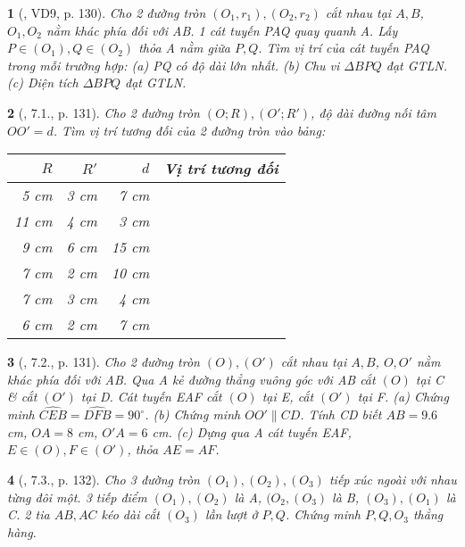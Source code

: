 \documentclass{article}
\newtheorem{baitoan}{}
\begin{document}
\begin{baitoan}[\cite{Binh_boi_duong_Toan_9_tap_1}, VD9, p. 130]
	Cho 2 đường tròn $(O_1,r_1),(O_2,r_2)$ cắt nhau tại $A,B$, $O_1,O_2$ nằm khác phía đối với AB. 1 cát tuyến PAQ quay quanh A. Lấy $P\in(O_1),Q\in(O_2)$ thỏa A nằm giữa $P,Q$. Tìm vị trí của cát tuyến PAQ trong mỗi trường hợp: (a) PQ có độ dài lớn nhất. (b) Chu vi $\Delta BPQ$ đạt {\rm GTLN}. (c) Diện tích $\Delta BPQ$ đạt {\rm GTLN}.
\end{baitoan}

\begin{baitoan}[\cite{Binh_boi_duong_Toan_9_tap_1}, 7.1., p. 131]
	Cho 2 đường tròn $(O;R),(O';R')$, độ dài đường nối tâm $OO' = d$. Tìm vị trí tương đối của 2 đường tròn vào bảng:
	\begin{table}[H]
		\centering
		\begin{tabular}{|r|r|r|c|}
			\hline
			$R$ & $R'$ & $d$ & Vị trí tương đối \\
			\hline
			5 cm & 3 cm & 7 cm &  \\
			\hline
			11 cm & 4 cm & 3 cm &  \\
			\hline
			9 cm & 6 cm & 15 cm &  \\
			\hline
			7 cm & 2 cm & 10 cm &  \\
			\hline
			7 cm & 3 cm & 4 cm &  \\
			\hline
			6 cm & 2 cm & 7 cm &  \\
			\hline
		\end{tabular}
	\end{table}
\end{baitoan}

\begin{baitoan}[\cite{Binh_boi_duong_Toan_9_tap_1}, 7.2., p. 131]
	Cho 2 đường tròn $(O),(O')$ cắt nhau tại $A,B$, $O,O'$ nằm khác phía đối với AB. Qua A kẻ đường thẳng vuông góc với AB cắt $(O)$ tại C \& cắt $(O')$ tại D. Cát tuyến EAF cắt $(O)$ tại E, cắt $(O')$ tại F. (a) Chứng minh $\widehat{CEB} = \widehat{DFB} = 90^\circ$. (b) Chứng minh $OO'\parallel CD$. Tính CD biết $AB = 9.6$ {\rm cm}, $OA = 8$  {\rm cm}, $O'A = 6$ {\rm cm}. (c) Dựng qua A cát tuyến EAF, $E\in(O),F\in(O')$, thỏa $AE = AF$.
\end{baitoan}

\begin{baitoan}[\cite{Binh_boi_duong_Toan_9_tap_1}, 7.3., p. 132]
	Cho 3 đường tròn $(O_1),(O_2),(O_3)$ tiếp xúc ngoài với nhau từng đôi một. 3 tiếp điểm $(O_1),(O_2)$ là A, $(O_2,(O_3)$ là B, $(O_3),(O_1)$ là C. 2 tia $AB,AC$ kéo dài cắt $(O_3)$ lần lượt ở $P,Q$. Chứng minh $P,Q,O_3$ thẳng hàng.
\end{baitoan}
\end{document}
